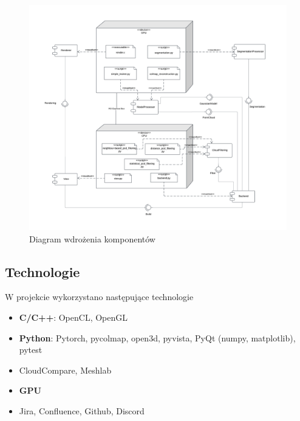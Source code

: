 \begin{figure}[!htb]
    \includegraphics[width=1.0\linewidth]{img/diagramy/diagram_wdrozenia_komponentow_3.png}
    \caption{Diagram wdrożenia komponentów}\label{fig:components_diagram}
\end{figure}









\subsection{Technologie}

W projekcie wykorzystano następujące technologie

\begin{itemize}
    \item \textbf{C/C++}: OpenCL, OpenGL
    \item \textbf{Python}: Pytorch, pycolmap, open3d, pyvista, PyQt (numpy, matplotlib), pytest
    \item CloudCompare, Meshlab
    \item \textbf{GPU}
    \item Jira, Confluence, Github, Discord
\end{itemize}

